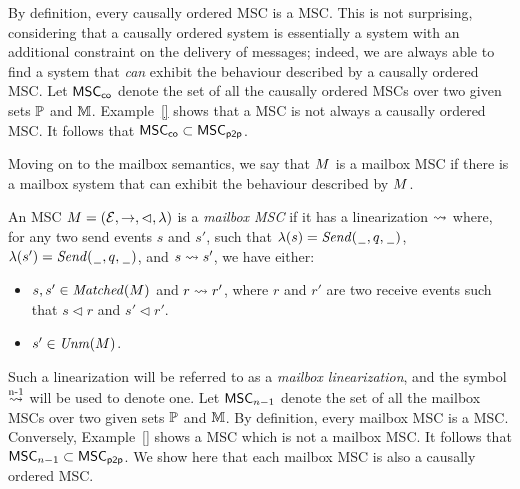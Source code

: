 By definition, every causally ordered MSC is a \pp MSC. This is not surprising, considering that a causally ordered system is essentially a \pp system with an additional constraint on the delivery of messages; indeed, we are always able to find a \pp system that \emph{can} exhibit the behaviour described by a causally ordered MSC. Let $\mathsf{MSC}_{\mathsf{co}}$ denote the set of all the causally ordered MSCs over two given sets $\mathbb{P}$ and $\mathbb{M}$. Example~\ref{} shows that a \pp MSC is not always a causally ordered MSC. It follows that $\mathsf{MSC}_{\mathsf{co}} \subset \mathsf{MSC}_{\mathsf{p2p}}$.

\medskip

Moving on to the mailbox semantics, we say that $M$ is a mailbox MSC if there is a mailbox system that can exhibit the behaviour described by $M$. 

\begin{definition}%
An MSC $M = (\mathcal{E},\to,\lhd,\lambda)$ is a \emph{mailbox MSC} if it has a linearization $\rightsquigarrow$ where, for any two send events $s$ and $s'$, such that $\lambda(s)={\mathit{Send}(\hspace{0.1em}\underline{\hspace{0.5em}}\hspace{0.1em},q,\hspace{0.1em}\underline{\hspace{0.5em}}\hspace{0.1em})}$, $\lambda(s')={\mathit{Send}(\hspace{0.1em}\underline{\hspace{0.5em}}\hspace{0.1em},q,\hspace{0.1em}\underline{\hspace{0.5em}}\hspace{0.1em})}$, and $s \rightsquigarrow s'$, we have either:
\begin{itemize}\itemsep=0.5ex
	\item $s,s' \in \mathit{Matched}(M)$ and $r \rightsquigarrow r'$, where $r$ and $r'$ are two receive events such that $s \lhd r$ and $s' \lhd r'$.
	\item $s' \in \mathit{Unm}(M)$.
\end{itemize}
\end{definition}

Such a linearization will be referred to as a \emph{mailbox linearization}, and the symbol $\overset{\text{n-1}}{\rightsquigarrow}$ will be used to denote one. Let $\mathsf{MSC}_{n\mathsf{-}1}$ denote the set of all the mailbox MSCs over two given sets $\mathbb{P}$ and $\mathbb{M}$. By definition, every mailbox MSC is a \pp MSC. Conversely, Example~\ref{} shows a \pp MSC which is not a mailbox MSC. It follows that $\mathsf{MSC}_{n\mathsf{-}1} \subset \mathsf{MSC}_{\mathsf{p2p}}$. We show here that each mailbox MSC is also a causally ordered MSC.

